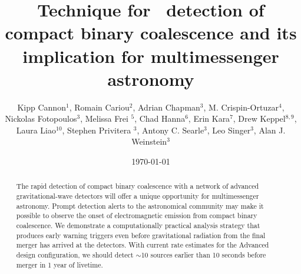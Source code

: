 \documentclass[showpacs,groupedaddress,showkeys,preprintnumbers]{iopart}
\begin{document}
\title[LLOID]{Technique for \earlywarning\ detection of compact binary coalescence and its implication for multimessenger astronomy}



\date{\today}

\author{Kipp Cannon$^{1}$, Romain Cariou$^{2}$, Adrian Chapman$^3$, M.
Crispin-Ortuzar$^4$, Nickolas Fotopoulos$^3$, Melissa Frei $^5$, Chad
Hanna$^{6}$, Erin Kara$^{7}$, Drew Keppel$^{8,9}$, Laura Liao$^{10}$, Stephen
Privitera $^3$, Antony C.  Searle$^3$, Leo Singer$^3$, Alan J.  Weinstein$^3$}

\address{$^1$ Canadian Institute for Theoretical Astrophysics, Toronto, ON,
Canada}
\address{$^2$  D\'{e}partement de physique, \'{E}cole Normale Sup\'{e}rieure de Cachan, 61
Avenue du Pr\'{e}sident Wilson, 94235 Cachan Cedex, France}
\address{$^3$ LIGO Laboratory - California Institute of Technology, Pasadena,
CA, USA} 
\address{$^4$ Facultat de Física, Universitat de València, E-46100 Burjassot,
Spain} 
\address{$^5$ The University of Texas at Austin, Austin, TX, USA}
\address{$^6$ Perimeter Institute for Theoretical Physics, Waterloo, ON,
Canada} 
\address{$^7$ Department of Physics and Astronomy, Barnard College, Columbia
University, New York, NY 10027, USA} 
\address{$^8$ Albert-Einstein-Institut, Max-Planck-Institut f\"{u}r
Gravitationphysik, Hannover, Germany} 
\address{$^9$ Leibniz Universit\"{a}t Hannover, Hannover, Germany}
\address{$^{10}$ Ryerson University, Toronto, ON, Canada}

\begin{abstract}
The rapid detection of compact binary coalescence with a network of advanced
gravitational-wave detectors will offer a unique opportunity for multimessenger astronomy.  Prompt detection alerts to the astronomical community may make it possible to observe the onset of electromagnetic emission from compact binary coalescence.  We demonstrate a computationally practical analysis strategy that produces early warning triggers even before gravitational radiation from the final merger has arrived at the detectors.  With current rate estimates for the Advanced \LIGO{} design configuration, we should detect $\sim$10 sources earlier than 10 seconds before merger in 1 year of livetime.
\end{abstract}


\end{document}
